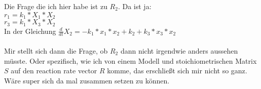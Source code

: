 \documentclass[]{scrartcl}
\begin{document}
Die Frage die ich hier habe ist zu $R_2$. Da ist ja:
\\
$r_1 = k_1 * X_1 * X_2$
\\
$r_3 = k_1 * X_3 * X_2$
\\
In der Gleichung $\frac{d}{dt} X_2 = -k_1 * x_1 * x_2 + k_2 + k_3 * x_3 * x_2$
\\
\\
Mir stellt sich dann die Frage, ob $R_2$ dann nicht irgendwie anders aussehen müsste. Oder spezifisch, wie ich von einem Modell und stoichiometrischen Matrix $S$ auf den reaction rate vector $R$ komme, das erschließt sich mir nicht so ganz. Wäre super sich da mal zusammen setzen zu können.
\end{document}
